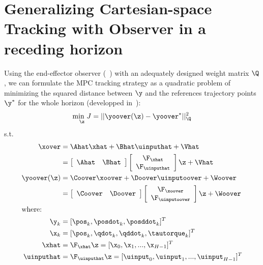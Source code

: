 \section{Generalizing Cartesian-space Tracking with Observer in a receding horizon}

Using the end-effector observer (~) with an adequately
designed weight matrix $\Q$, we
can formulate the MPC tracking strategy as a quadratic problem of minimizing the
squared distance between $\y$ and the references trajectory points $\y^*$ for
the whole horizon (developped in~):
\begin{gather}
  \underset{\z}{\text{min }J} = ||\yoover(\z) - \yoover^*||^2_{\Q} \label{eqn:mpc_cost}
\end{gather}
s.t.
\begin{align}
  \xover &= \Ahat \xhat + \Bhat \uinputhat + \Vhat \label{eqn:ss_z_equality} \\
         &= \left[
           \begin{array}{cc}
             \Ahat & \Bhat
           \end{array}\right]
                     \left[\begin{array}{c}
                             \F_{\xhat} \\
                             \F_{\uinputhat}
                           \end{array}\right] \z + \Vhat \\
  \yoover(\z) &= \Coover \xoover + \Doover \uinputoover + \Woover \label{eqn:ss_z_observer} \\
         &= \left[
           \begin{array}{cc}
             \Coover & \Doover
           \end{array}\right]
                     \left[\begin{array}{c}
                             \F_{\xoover} \\
                             \F_{\uinputoover}
                           \end{array}\right] \z + \Woover \\
  \shortintertext{where:}
  \y_k &= [\pos_k,\posdot_k,\posddot_k]^T \\
  \x_k &= [\pos_k,\qdot_k,\qddot_k,\tautorque_k]^T \\
  \xhat &= \F_{\xhat} \z  = [\x_0, \x_1,...,\x_{H-1}]^T \\
  \uinputhat &= \F_{\uinputhat} \z = [\uinput_0, \uinput_1,...,\uinput_{H-1}]^T \\

\end{align}
